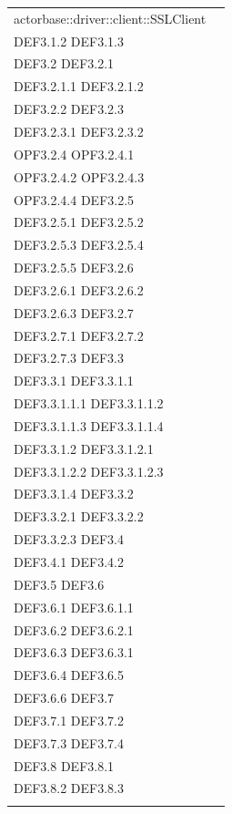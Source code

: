 \documentclass{scalatekids-article}
\begin{document}
\begin{longtable}[H]{|p{11.5cm}|p{5.5cm}|}
actorbase::driver::client::SSLClient & \multiLineCell[t]{DEF3.1 DEF3.1.1\\DEF3.1.2 DEF3.1.3\\DEF3.2 DEF3.2.1\\DEF3.2.1.1 DEF3.2.1.2\\DEF3.2.2 DEF3.2.3\\DEF3.2.3.1 DEF3.2.3.2\\OPF3.2.4 OPF3.2.4.1\\OPF3.2.4.2 OPF3.2.4.3\\OPF3.2.4.4 DEF3.2.5\\DEF3.2.5.1 DEF3.2.5.2\\DEF3.2.5.3 DEF3.2.5.4\\DEF3.2.5.5 DEF3.2.6\\DEF3.2.6.1 DEF3.2.6.2\\DEF3.2.6.3 DEF3.2.7\\DEF3.2.7.1 DEF3.2.7.2\\DEF3.2.7.3 DEF3.3\\DEF3.3.1 DEF3.3.1.1\\DEF3.3.1.1.1 DEF3.3.1.1.2\\DEF3.3.1.1.3 DEF3.3.1.1.4\\DEF3.3.1.2 DEF3.3.1.2.1\\DEF3.3.1.2.2 DEF3.3.1.2.3\\DEF3.3.1.4 DEF3.3.2\\DEF3.3.2.1 DEF3.3.2.2\\DEF3.3.2.3 DEF3.4\\DEF3.4.1 DEF3.4.2\\DEF3.5 DEF3.6\\DEF3.6.1 DEF3.6.1.1\\DEF3.6.2 DEF3.6.2.1\\DEF3.6.3 DEF3.6.3.1\\DEF3.6.4 DEF3.6.5\\DEF3.6.6 DEF3.7\\DEF3.7.1 DEF3.7.2\\DEF3.7.3 DEF3.7.4\\DEF3.8 DEF3.8.1\\DEF3.8.2 DEF3.8.3\\}\\
\hline

\end{longtable}
\end{document}

